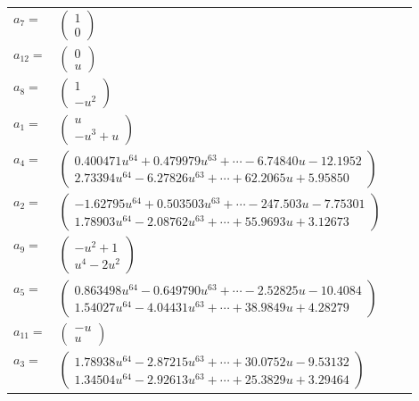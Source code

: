 \documentclass[1p]{elsarticle_modified}
\theoremstyle{definition}
\begin{document}
\begin{tabular}{m{7pt} m{180pt} m{7pt} m{180pt} }
\flushright $a_{7}=$&$\begin{pmatrix}1\\0\end{pmatrix}$ \\
\flushright $a_{12}=$&$\begin{pmatrix}0\\u\end{pmatrix}$ \\
\flushright $a_{8}=$&$\begin{pmatrix}1\\- u^2\end{pmatrix}$ \\
\flushright $a_{1}=$&$\begin{pmatrix}u\\- u^3+u\end{pmatrix}$ \\
\flushright $a_{4}=$&$\begin{pmatrix}0.400471 u^{64}+0.479979 u^{63}+\cdots-6.74840 u-12.1952\\2.73394 u^{64}-6.27826 u^{63}+\cdots+62.2065 u+5.95850\end{pmatrix}$ \\
\flushright $a_{2}=$&$\begin{pmatrix}-1.62795 u^{64}+0.503503 u^{63}+\cdots-247.503 u-7.75301\\1.78903 u^{64}-2.08762 u^{63}+\cdots+55.9693 u+3.12673\end{pmatrix}$ \\
\flushright $a_{9}=$&$\begin{pmatrix}- u^2+1\\u^4-2 u^2\end{pmatrix}$ \\
\flushright $a_{5}=$&$\begin{pmatrix}0.863498 u^{64}-0.649790 u^{63}+\cdots-2.52825 u-10.4084\\1.54027 u^{64}-4.04431 u^{63}+\cdots+38.9849 u+4.28279\end{pmatrix}$ \\
\flushright $a_{11}=$&$\begin{pmatrix}- u\\u\end{pmatrix}$ \\
\flushright $a_{3}=$&$\begin{pmatrix}1.78938 u^{64}-2.87215 u^{63}+\cdots+30.0752 u-9.53132\\1.34504 u^{64}-2.92613 u^{63}+\cdots+25.3829 u+3.29464\end{pmatrix}$ \\

\end{tabular}
\end{document}
